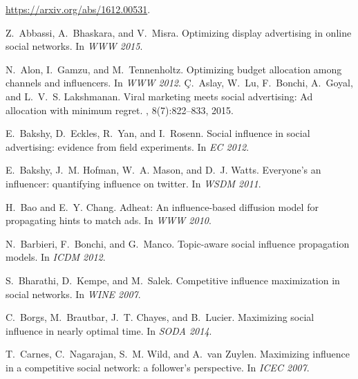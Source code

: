 \enlargethispage{\baselineskip}

\begin{thebibliography}{10}

\begin{scriptsize}

\newblock \url{https://arxiv.org/abs/1612.00531}.

Z.~Abbassi, A.~Bhaskara, and V.~Misra.
\newblock Optimizing display advertising in online social networks.
\newblock In {\em {WWW} 2015}.

N.~Alon, I.~Gamzu, and M.~Tennenholtz.
\newblock Optimizing budget allocation among channels and influencers.
\newblock In {\em WWW 2012}.
{\c{C}}.~Aslay, W.~Lu, F.~Bonchi, A.~Goyal, and L.~V.~S. Lakshmanan.
\newblock Viral marketing meets social advertising: Ad allocation with minimum
  regret.
, 8(7):822--833, 2015.

E.~Bakshy, D.~Eckles, R.~Yan, and I.~Rosenn.
\newblock Social influence in social advertising: evidence from field
  experiments.
\newblock In {\em EC 2012}.

E.~Bakshy, J.~M. Hofman, W.~A. Mason, and D.~J. Watts.
\newblock Everyone's an influencer: quantifying influence on twitter.
\newblock In {\em WSDM 2011}.

H.~Bao and E.~Y. Chang.
\newblock Adheat: An influence-based diffusion model for propagating hints to
  match ads.
\newblock In {\em WWW 2010}.

N.~Barbieri, F.~Bonchi, and G.~Manco.
\newblock Topic-aware social influence propagation models.
\newblock In {\em ICDM 2012}.

S.~Bharathi, D.~Kempe, and M.~Salek.
\newblock Competitive influence maximization in social networks.
\newblock In {\em WINE 2007}.

C.~Borgs, M.~Brautbar, J.~T. Chayes, and B.~Lucier.
\newblock Maximizing social influence in nearly optimal time.
\newblock In {\em SODA 2014}.

T.~Carnes, C.~Nagarajan, S.~M. Wild, and A.~van Zuylen.
\newblock Maximizing influence in a competitive social network: a follower's
  perspective.
\newblock In {\em ICEC 2007}.


\end{scriptsize}
\end{thebibliography}
